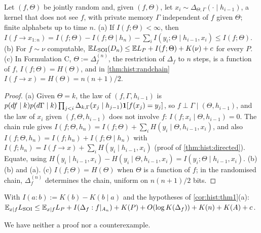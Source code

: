 \begin{proposition}\label{prop:hist:shannon}
Let $(f,\Theta)$ be jointly random and, given $(f,\Theta)$, let $x_i\sim\Delta_{\Theta,\Gamma}(\cdot\mid h_{i-1})$, a kernel that does not see $f$, with private memory $\Gamma$ independent of $f$ given $\Theta$; finite alphabets up to time $n$. (a) If $I(f;\Theta)<\infty$, then $I(f\to x_{1:n})=I(f;\Theta)-I(f;\Theta\mid h_n)-\sum_iI(y_i;\Theta\mid h_{i-1},x_i)\le I(f;\Theta)$. (b) For $f\sim\nu$ computable, $\mathbb{E}L_{\mathrm{SOI}}(D_n)\le\mathbb{E} L_P+I(f;\Theta)+K(\nu)+c$ for every $P$. (c) In Formulation C, $\Theta:=\Delta^{(n)}_f$, the restriction of $\Delta_f$ to $n$ steps, is a function of $f$, $I(f;\Theta)=H(\Theta)$, and in \cref{thm:hist:randchain} $I(f\to x)=H(\Theta)=n(n+1)/2$.
\end{proposition}

\begin{proof}
(a) Given $\Theta=k$, the law of $(f,\Gamma,h_{i-1})$ is $p(df\mid k)p(d\Gamma\mid k)\prod_{j<i}\Delta_{k,\Gamma}(x_j\mid h_{j-1})\mathbf{1}[f(x_j)=y_j]$, so $f\perp\Gamma\mid(\Theta,h_{i-1})$, and the law of $x_i$ given $(f,\Theta,h_{i-1})$ does not involve $f$: $I(f;x_i\mid\Theta,h_{i-1})=0$. The chain rule gives $I(f;\Theta,h_n)=I(f;\Theta)+\sum_iH(y_i\mid\Theta,h_{i-1},x_i)$, and also $I(f;\Theta,h_n)=I(f;h_n)+I(f;\Theta\mid h_n)$ with $I(f;h_n)=I(f\to x)+\sum_iH(y_i\mid h_{i-1},x_i)$ (proof of \cref{thm:hist:directed}). Equate, using $H(y_i\mid h_{i-1},x_i)-H(y_i\mid\Theta,h_{i-1},x_i)=I(y_i;\Theta\mid h_{i-1},x_i)$. (b) (b) and (a). (c) $I(f;\Theta)=H(\Theta)$ when $\Theta$ is a function of $f$; in the randomised chain, $\Delta^{(n)}_f$ determines the chain, uniform on $n(n+1)/2$ bits. %
\end{proof}

\begin{conjecture}\label{conj:hist:algmi}
With $I(a:b):=K(b)-K(b\mid a)$ and the hypotheses of \cref{cor:hist:thm1}(a): $\mathbb{E}_{x\mid f}L_{\mathrm{SOI}}\le\mathbb{E}_{x\mid f}L_P+I(\Delta_f:f|_{A_n})+K(P)+O(\log K(\Delta_f))+K(n)+K(A)+c$.
\end{conjecture}

We have neither a proof nor a counterexample.

\subsection{\SFIhist}\label{app:hist:sfihist}

